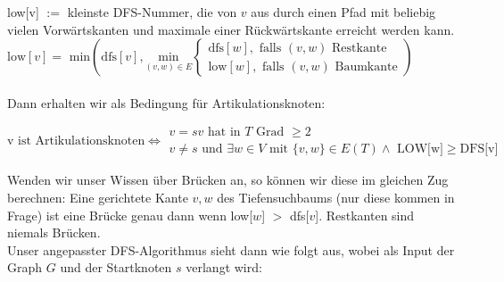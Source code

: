 \documentclass[a4paper]{report}
\begin{document}
low[v] $:=$ kleinste DFS-Nummer, die von $v$ aus durch einen Pfad mit beliebig vielen Vorwärtskanten und maximale
einer Rückwärtskante erreicht werden kann. \\

$
    \text{low}[v] = \text{ min} \left(
        \text{dfs}[v], \underset{(v,w) \in E}{\text{  min  }}
        \begin{cases}
            \text{dfs}[w], \text{ falls }(v,w) \text{ Restkante}\\
            \text{low}[w], \text{ falls }(v,w) \text{ Baumkante}
          \end{cases}
    \right)
$ \\
\\

Dann erhalten wir als Bedingung für Artikulationsknoten:

{\small 
\[
\text{v ist Artikulationsknoten} \Leftrightarrow
\begin{array}{l}
    v = s  v \text{ hat in } T \text{ Grad } \geq 2\\
    v \neq s \text{ und } \exists w \in V \text{ mit }\{v,w\} \in E(T) \wedge \text{ LOW[w]} \geq \text{DFS[v]}
\end{array}
\]
}

Wenden wir unser Wissen über Brücken an, so können wir diese im gleichen Zug berechnen: Eine gerichtete Kante 
${v, w}$ des Tiefensuchbaums (nur diese kommen in Frage) ist eine Brücke genau dann wenn low[$w$] $>$ dfs[$v$].
Restkanten sind niemals Brücken.\\

Unser angepasster DFS-Algorithmus sieht dann wie folgt aus, wobei als Input der Graph $G$ 
und der Startknoten $s$ verlangt wird:
\end{document}
